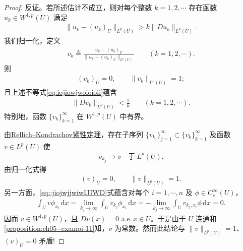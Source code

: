\documentclass[../../main.tex]{subfiles}
\begin{document}
\begin{proof}

反证。若所述估计不成立，则对每个整数 $k=1,2,\cdots$ 存在函数 $u_{k}\in W^{1,p}(U)$ 满足
\begin{align}\label{eq:iojiowjwoioioii}
\|u_{k}-(u_{k})_{U}\|_{L^{p}(U)}>k\|Du_{k}\|_{L^{p}(U)}.
\end{align}
我们归一化，定义
\begin{align*}
v_{k}\triangleq\frac{u_{k}-(u_{k})_{U}}{\|u_{k}-(u_{k})_{U}\|_{L^{p}(U)}}\qquad (k=1,2,\cdots).
\end{align*}
则
\begin{align*}
(v_{k})_{U}=0,\qquad \|v_{k}\|_{L^{p}(U)}=1;
\end{align*}
且上述不等式\eqref{eq:iojiowjwoioioii}蕴含
\begin{align}\label{eq::jiojwjjwiwIJIWD}
\|Dv_{k}\|_{L^{p}(U)}<\frac{1}{k}\qquad (k=1,2,\cdots).
\end{align}
特别地，函数 $\{v_{k}\}_{k=1}^{\infty}$ 在 $W^{1,p}(U)$ 中有界。

由\hyperref[theorem:Rellich--Kondrachov紧性定理]{Rellich--Kondrachov紧性定理}，存在子序列 $\{v_{k_{j}}\}_{j=1}^{\infty}\subset\{v_{k}\}_{k=1}^{\infty}$ 及函数 $v\in L^{p}(U)$ 使
\begin{align}
v_{k_{j}}\to v\quad\text{于}\ L^{p}(U).
\end{align}
由归一化式得
\begin{align*}
(v)_{U}=0,\qquad \|v\|_{L^{p}(U)}=1.
\end{align*}
另一方面，\eqref{eq::jiojwjjwiwIJIWD}式蕴含对每个 $i=1,\cdots,n$ 及 $\phi\in C^{\infty}_{c}(U)$，
\begin{align*}
\int_{U}v\phi_{x_{i}}\,\mathrm{d}x
=\lim_{k_{j}\to\infty}\int_{U}v_{k_{j}}\phi_{x_{i}}\,\mathrm{d}x
=-\lim_{k_{j}\to\infty}\int_{U}v_{k_{j},x_{i}}\phi\,\mathrm{d}x=0.
\end{align*}
因而 $v\in W^{1,p}(U)$，且 $Dv(x)=0$ a.e.$\,x\in U$。于是由于 $U$ 连通和\cref{proposition:ch05--examoi-11}知，$v$ 为常数。然而此结论与 $\|v\|_{L^{p}(U)}=1$、$(v)_{U}=0$ 矛盾!
\end{proof}
\end{document}

